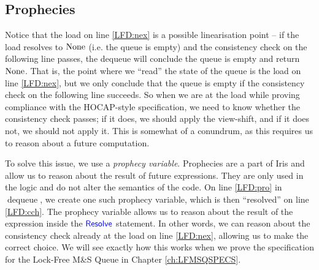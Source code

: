 \documentclass[a4paper, 10pt]{report}
\theoremstyle{definition}
\newcommand{\dequeue}{\operatorname{dequeue}}
\newcommand{\msq}{M\&S Queue}
\newcommand{\lfmsq}{Lock-Free \msq{}}
\begin{document}
\subsection{Prophecies}
\label{LFMSQ:implementation:sub:prophecies}

Notice that the load on line \ref{LFD:nex} is a possible linearisation point -- if the load resolves to $\operatorname{None}$ (i.e. the queue is empty) and the consistency check on the following line passes, the dequeue will conclude the queue is empty and return $\operatorname{None}$. That is, the point where we ``read'' the state of the queue is the load on line \ref{LFD:nex}, but we only conclude that the queue is empty if the consistency check on the following line succeeds. So when we are at the load while proving compliance with the HOCAP-style specification, we need to know whether the consistency check passes; if it does, we should apply the view-shift, and if it does not, we should not apply it. This is somewhat of a conundrum, as this requires us to reason about a future computation.

To solve this issue, we use a \textit{prophecy variable}. Prophecies are a part of Iris \citep{DBLP:journals/pacmpl/JungLPRTDJ20} and allow us to reason about the result of future expressions. They are only used in the logic and do not alter the semantics of the code. On line \ref{LFD:pro} in $\dequeue$, we create one such prophecy variable, which is then ``resolved'' on line \ref{LFD:cch}. The prophecy variable allows us to reason about the result of the expression inside the $\textsf{\color{blue} Resolve}$ statement. In other words, we can reason about the consistency check already at the load on line \ref{LFD:nex}, allowing us to make the correct choice. We will see exactly how this works when we prove the specification for the \lfmsq{} in Chapter \ref{ch:LFMSQSPECS}.
\end{document}

